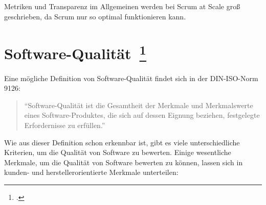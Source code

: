 Metriken und Transparenz im Allgemeinen werden bei Scrum at Scale groß geschrieben, da Scrum nur so optimal funktionieren kann.

\clearpage
\section[Software-Qualität]{Software-Qualität~\footcite[vgl.][Kapitel 1.2]{hoffmann_software_qualitat_2013}}

Eine mögliche Definition von Software-Qualität findet sich in der DIN-ISO-Norm 9126:

\begin{quote}
  ``Software-Qualität ist die Gesamtheit der Merkmale und Merkmalswerte eines Software-Produktes, die sich auf dessen Eignung beziehen, festgelegte Erfordernisse zu erfüllen.''
\end{quote}

Wie aus dieser Definition schon erkennbar ist, gibt es viele unterschiedliche Kriterien, um die Qualität von Software zu bewerten.
Einige wesentliche Merkmale, um die Qualität von Software bewerten zu können, lassen sich in kunden- und herstellerorientierte Merkmale unterteilen:

